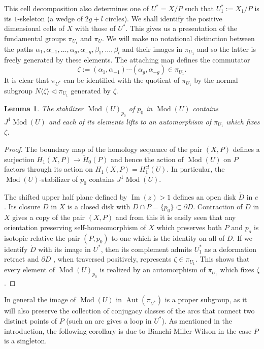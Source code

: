 \documentclass[12pt,letterpaper]{amsart}
\numberwithin{equation}{section}
\newcommand{\p}{\partial}
\def\la{\langle}
\def\ra{\rangle}
\newcommand\aut{\operatorname{Aut}}
\newcommand\im{\operatorname{Im}}
\newcommand\Mod{\operatorname{Mod}}
\newtheorem{lemma}[theorem]{Lemma}
\theoremstyle{remark}
\begin{document}
This cell decomposition  also determines one  of $U^*=X/P$ such that  $U_1^*:=X_1/P$ is its $1$-skeleton (a wedge of $2g+l$ circles). We shall  identify the positive dimensional cells of $X$ with those of $U^*$. This gives us a presentation of the fundamental groups 
$\pi_{U_1}$ and $\pi_U$. We will make no notational distinction between the paths $\alpha_1, \alpha_{-1}, \dots, \alpha_g,\alpha_{-g}, \beta_1, \dots, \beta_l$ and their images in $\pi_{U_1}$ and so the latter is freely  generated by these elements. The attaching map defines the commutator
\begin{equation}\label{eqn:defzeta}
\zeta:=(\alpha_1, \alpha_{-1})\cdots (\alpha_g, \alpha_{-g})\in \pi_{U_1}.
\end{equation}
It is clear that  $\pi_{U^*}$ can be identified with the quotient of $\pi_{U_1}$ by the normal subgroup $N\la\zeta\ra\vartriangleleft\pi_{U_1}$ generated by $\zeta$. 
 
\begin{lemma}\label{lemma:stabilizer_p_0}
The stabilizer {$\Mod(U)_{p_0}$} of $p_0$ in  $\Mod(U)$ contains $J^1\Mod(U)$ and each of its elements  lifts to an automorphism of  $\pi_{U_1}$ which fixes $\zeta$.
\end{lemma}
\begin{proof}
The boundary map of the homology sequence of the pair $(X,P)$ defines a surjection $H_1(X,P)\to \tilde H_0(P)$ and hence the action of $\Mod(U)$ on $P$ factors through its action on $H_1(X,P)=H_1^{cl}(U)$. In particular, the 
$\Mod(U)$-stabilizer of $p_0$ contains $J^1\Mod(U)$.

The shifted upper half plane defined by $\im (z)>1$ defines an open disk $\mathring D$ in $e$. Its  closure $D$ in $X$ is a closed disk 
with  $D\cap P=\{p_0\}\subset \p D$. Contraction of $D$ in $X$ gives a copy of the pair $(X,P)$ and from this it is easily seen that any  orientation preserving self-homeomorphism of $X$ which preserves both $P$ and $p_o$ is isotopic relative the pair $(P,p_0)$ to one which is the identity on  all of  $D$.
If  we identify $\mathring D$ with its image  in $U^*$, then its complement admits $U_1^*$ as a deformation retract and  $\p D$ , when traversed positively,  represents  $\zeta\in \pi_{U_1}$.  This shows that every element of $\Mod(U)_{p_0}$ is realized by an automorphism of $\pi_{U_1}$ which fixes $\zeta$.
\end{proof}

 In general the image of $\Mod(U)$ in  $\aut (\pi_{U^*})$ is a proper subgroup, as it will also preserve the collection of conjugacy classes of the 
arcs that connect two distinct points of $P$ (such an arc gives a loop in $U^*$).  As mentioned in the introduction, the following corollary is due to
Bianchi-Miller-Wilson in the case $P$ is a singleton.
\end{document}
